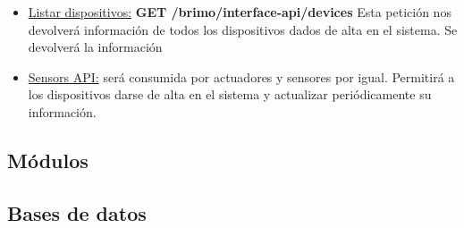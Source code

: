 \begin{itemize}
\item \underline{Listar dispositivos:} \textbf{GET /brimo/interface-api/devices} Esta petición nos devolverá información de todos los dispositivos
dados de alta en el sistema. Se devolverá la información
\item \underline{Sensors API:} será consumida por actuadores y sensores por igual. Permitirá a los dispositivos darse de alta en el sistema y actualizar
periódicamente su información.
\end{itemize}

\subsection{Módulos}
\subsection{Bases de datos}

